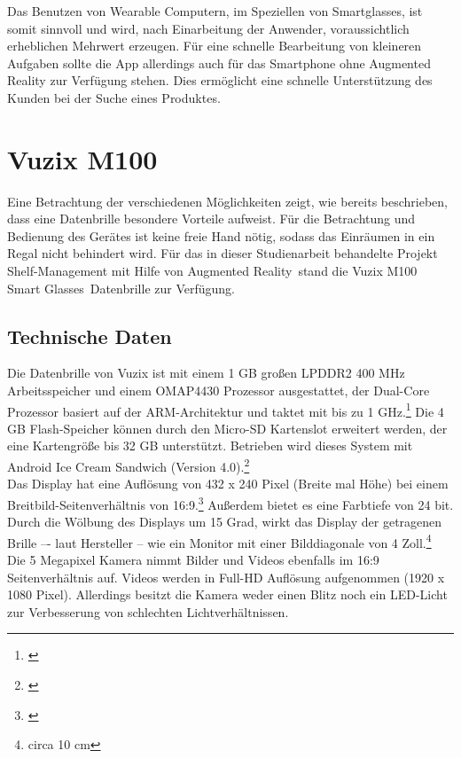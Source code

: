 Das Benutzen von Wearable Computern, im Speziellen von Smartglasses, ist somit sinnvoll und wird, nach Einarbeitung der Anwender, voraussichtlich erheblichen Mehrwert erzeugen. Für eine schnelle Bearbeitung von kleineren Aufgaben sollte die App allerdings auch für das Smartphone ohne Augmented Reality zur Verfügung stehen. Dies ermöglicht \zB eine schnelle Unterstützung des Kunden bei der Suche eines Produktes.

\section{Vuzix M100}
\label{sec:vuzix}
Eine Betrachtung der verschiedenen Möglichkeiten zeigt, wie bereits beschrieben, dass eine Datenbrille besondere Vorteile aufweist. Für die Betrachtung und Bedienung des Gerätes ist keine freie Hand nötig, sodass das Einräumen in ein Regal nicht behindert wird. Für das in dieser Studienarbeit behandelte Projekt \glqq Shelf-Management mit Hilfe von Augmented Reality\grqq\ stand die \glqq Vuzix M100 Smart Glasses\grqq\ Datenbrille zur Verfügung.

\subsection{Technische Daten}
Die Datenbrille von Vuzix ist mit einem 1 \ac{GB} großen LPDDR2 400 \ac{MHz} Arbeitsspeicher und einem OMAP4430 Prozessor ausgestattet, der Dual-Core Prozessor basiert auf der \acs{ARM}-Architektur und taktet mit bis zu 1 \ac{GHz}.\footnote{\citep{omap4430}} Die 4 \ac{GB} Flash-Speicher können durch den Micro-\acs{SD} Kartenslot erweitert werden, der eine Kartengröße bis 32 \ac{GB} unterstützt. Betrieben wird dieses System mit Android Ice Cream Sandwich (Version 4.0).\footnote{\citep{vuzixm100}}\\

Das Display hat eine Auflösung von 432 x 240 Pixel (Breite mal Höhe) bei einem Breitbild-Seitenverhältnis von 16:9.\footnote{\citep{wqvga}} Außerdem bietet es eine Farbtiefe von 24 bit. Durch die Wölbung des Displays um 15 Grad, wirkt das Display der getragenen Brille –- laut Hersteller -- wie ein Monitor mit einer Bilddiagonale von 4 Zoll.\footnote{circa 10 \ac{cm}}\\

Die 5 Megapixel Kamera nimmt Bilder und Videos ebenfalls im 16:9 Seitenverhältnis auf. Videos werden in Full-\acs{HD} Auflösung aufgenommen (1920 x 1080 Pixel). Allerdings besitzt die Kamera weder einen Blitz noch ein LED-Licht zur Verbesserung von schlechten Lichtverhältnissen.\\

